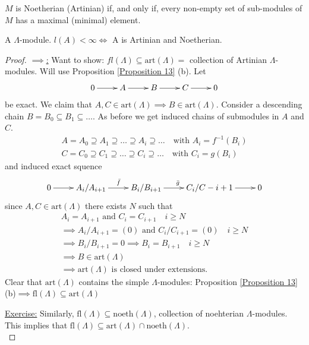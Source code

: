 \noindent \(M\) is Noetherian (Artinian) if, and only if, every non-empty set of sub-modules of \(M\) has a maximal (minimal) element.

\begin{prop}
A \(\Lambda\)-module. \(l(A) < \infty \Leftrightarrow\) A is  Artinian and Noetherian.
\end{prop}
\begin{proof}\underline{\(\implies\):} Want to show: \(fl(\Lambda) \subseteq \text{art}(\Lambda) = \) collection of Artinian \(\Lambda\)-modules. Will use Proposition \ref{Proposition 13} (b). Let 
\begin{align*}
    \xymatrix{0\ar[r] & A\ar[r] & B\ar[r] & C\ar[r] & 0}
\end{align*}
be exact. We claim that \(A, C\in\text{art}(\Lambda) \implies B\in\text{art}(\Lambda)\). Consider a descending chain \( B = B_0 \subseteq B_1 \subseteq \dots\). As before we get induced chains of submodules in \(A\) and \(C\). 
\begin{gather*}
    A = A_0 \supseteq A_1 \supseteq\dots\supseteq A_i\supseteq\dots\quad\text{with } A_i = f^{-1}(B_i)\\
    C = C_0 \supseteq C_1 \supseteq\dots\supseteq C_i\supseteq\dots\quad\text{with } C_i = g(B_i)
\end{gather*}
and induced exact squence
\begin{align*}
    \xymatrix{0\ar[r] & A_i/A_{i+1}\ar[r]^{\bar{f}} & B_i/B_{i+1}\ar[r]^{\bar{g}} & C_i/C-{i+1}\ar[r] & 0}
\end{align*}
since \(A, C\in\text{art}(\Lambda)\) there exists \(N\) such that
\begin{gather*}
A_i = A_{i+1} \text{ and } C_i = C_{i+1}\quad i\geq N\\
\implies A_i/A_{i+1} = (0) \text{ and } C_i/C_{i+1} = (0) \quad i \geq N \\
\implies B_i/B_{i+1} = 0 \implies B_i = B_{i+1} \quad i\geq N\\
\implies B\in\text{art}(\Lambda) \\
\implies \text{art}(\Lambda) \text{ is closed under extensions.}
\end{gather*}
Clear that \(\text{art}(\Lambda)\) contains the simple \(\Lambda\)-modules: Proposition \ref{Proposition 13}(b)\(\implies  \text{fl}(\Lambda)\subseteq\text{art}(\Lambda)\)

\noindent\underline{Exercise:} Similarly, \(\text{fl}(\Lambda)\subseteq\text{noeth}(\Lambda)\), collection of noehterian \(\Lambda\)-modules. This implies that \(\text{fl}(\Lambda)\subseteq\text{art}(\Lambda)\cap\text{noeth}(\Lambda)\).\\[0.5cm]


\end{proof}
